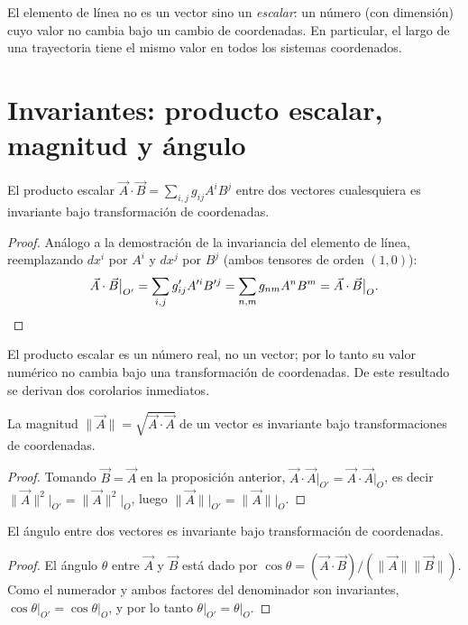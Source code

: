 \begin{observacion}
El elemento de línea no es un vector sino un \emph{escalar}: un número
(con dimensión) cuyo valor no cambia bajo un cambio de coordenadas. En
particular, el largo de una trayectoria tiene el mismo valor en todos los
sistemas coordenados.
\end{observacion}

\section{Invariantes: producto escalar, magnitud y ángulo}

\begin{proposicionc}
El producto escalar $\vec A\cdot\vec B = \sum_{i,j} g_{ij} A^i B^j$ entre
dos vectores cualesquiera es invariante bajo transformación de
coordenadas.
\end{proposicionc}

\begin{proof}
Análogo a la demostración de la invariancia del elemento de línea,
reemplazando $dx^i$ por $A^i$ y $dx^j$ por $B^j$ (ambos tensores de orden
$(1,0)$):
\[
\vec A\cdot\vec B\big|_{O'} = \sum_{i,j} g'_{ij} A'^i B'^j = \sum_{n,m}
g_{nm} A^n B^m = \vec A\cdot\vec B\big|_O . \qedhere
\]
\end{proof}

El producto escalar es un número real, no un vector; por lo tanto su
valor numérico no cambia bajo una transformación de coordenadas. De este
resultado se derivan dos corolarios inmediatos.

\begin{corolario}
La magnitud $\|\vec A\| = \sqrt{\vec A\cdot\vec A}$ de un vector es
invariante bajo transformaciones de coordenadas.
\end{corolario}

\begin{proof}
Tomando $\vec B=\vec A$ en la proposición anterior,
$\vec A\cdot\vec A\big|_{O'} = \vec A\cdot\vec A\big|_O$, es decir
$\|\vec A\|^2\big|_{O'} = \|\vec A\|^2\big|_O$, luego
$\|\vec A\|\big|_{O'} = \|\vec A\|\big|_O$. \qedhere
\end{proof}

\begin{corolario}
El ángulo entre dos vectores es invariante bajo transformación de
coordenadas.
\end{corolario}

\begin{proof}
El ángulo $\theta$ entre $\vec A$ y $\vec B$ está dado por
$\cos\theta = (\vec A\cdot\vec B)/(\|\vec A\|\|\vec B\|)$. Como el
numerador y ambos factores del denominador son invariantes,
$\cos\theta\big|_{O'} = \cos\theta\big|_O$, y por lo tanto
$\theta\big|_{O'} = \theta\big|_O$. \qedhere
\end{proof}


